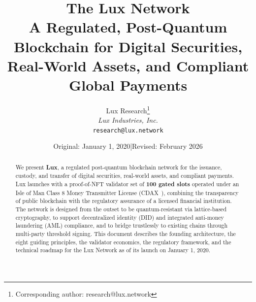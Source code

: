 \documentclass[11pt,a4paper]{article}
\title{The Lux Network\\[6pt]
\large A Regulated, Post-Quantum Blockchain for Digital Securities,\\
Real-World Assets, and Compliant Global Payments}
\author{
Lux Research\thanks{Corresponding author: research@lux.network}\\
\textit{Lux Industries, Inc.}\\
\texttt{research@lux.network}
}
\date{Original: January 1, 2020\quad|\quad Revised: February 2026}
\begin{document}
\luxcoverpage

\begin{abstract}
We present \textbf{Lux}, a regulated post-quantum blockchain network
for the issuance, custody, and transfer of digital securities,
real-world assets, and compliant payments. Lux launches with a
proof-of-NFT validator set of \textbf{100 gated slots} operated under
an Isle of Man Class 8 Money Transmitter License (CDAX~\cite{cdax}),
combining the transparency of public blockchain with the regulatory
assurance of a licensed financial institution. The network is designed
from the outset to be quantum-resistant via lattice-based cryptography,
to support decentralized identity (DID) and integrated anti-money
laundering (AML) compliance, and to bridge trustlessly to existing
chains through multi-party threshold signing. This document describes
the founding architecture, the eight guiding principles, the validator
economics, the regulatory framework, and the technical roadmap for the
Lux Network as of its launch on January 1, 2020.
\end{abstract}

\tableofcontents
\newpage












\end{document}
